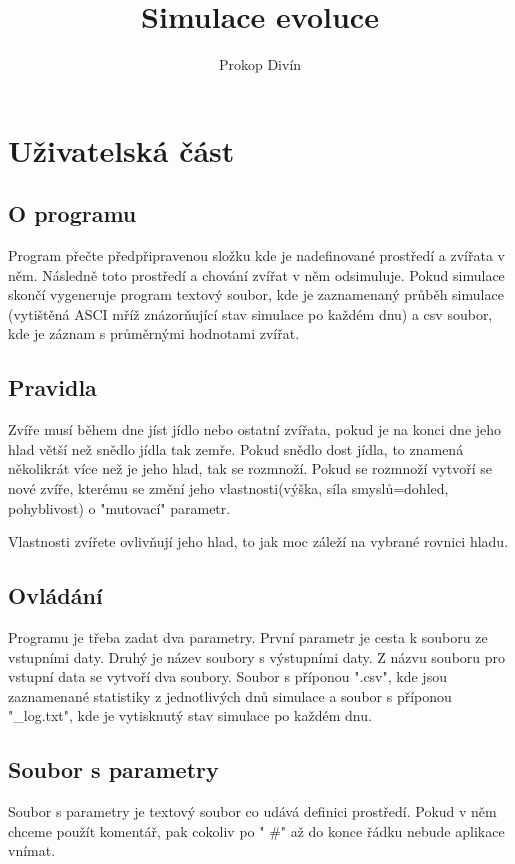 \documentclass[10pt,a4paper]{article}
\title{Simulace evoluce}
\author{Prokop Divín}
\begin{document}
\maketitle

\newpage

\tableofcontents

\newpage

\section{Uživatelská část}
\subsection{O programu}

Program přečte předpřipravenou složku kde je nadefinované prostředí a zvířata v něm.
Následně toto prostředí a chování zvířat v něm odsimuluje. Pokud simulace skončí vygeneruje program textový soubor, kde je zaznamenaný průběh simulace (vytištěná ASCI mříž znázorňující stav simulace po každém dnu) a csv soubor, kde je záznam s průměrnými hodnotami zvířat. 
  

\subsection{Pravidla} 
Zvíře musí během dne jíst jídlo nebo ostatní zvířata, pokud je na konci dne jeho hlad větší než snědlo jídla tak zemře. Pokud snědlo dost jídla, to znamená několikrát více než je jeho hlad, tak se rozmnoží. Pokud se rozmnoží vytvoří se nové zvíře, kterému se 
změní jeho vlastnosti(výška, síla smyslů=dohled, pohyblivost) o "mutovací" parametr.

Vlastnosti zvířete ovlivňují jeho hlad, to jak moc záleží na vybrané rovnici hladu.


\subsection{ Ovládání }
Programu je třeba zadat dva parametry. První parametr je cesta k souboru ze vstupními daty. Druhý je název soubory s výstupními daty.
Z názvu souboru pro vstupní data se vytvoří dva soubory. Soubor s příponou ".csv", kde jsou zaznamenané statistiky z jednotlivých dnů simulace a soubor s příponou "\_log.txt", kde je vytisknutý stav simulace po každém dnu.


\subsection{Soubor s parametry}
 Soubor s parametry je textový soubor co udává definici prostředí. Pokud v něm chceme použít komentář, pak
 cokoliv po " \#" až do konce řádku nebude aplikace vnímat.
 
\end{document}
